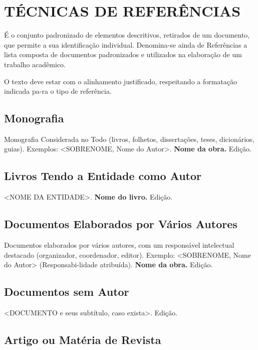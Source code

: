 %
%

\chapter{TÉCNICAS DE REFERÊNCIAS}

É o conjunto padronizado de elementos descritivos, retirados de um documento, que permite a sua identificação individual. Denomina-se ainda de Referências a lista composta de documentos padronizados e utilizados na elaboração de um trabalho acadêmico.

O texto deve estar com o alinhamento justificado, respeitando a formatação indicada pa-ra o tipo de referência. 

\section{Monografia}

Monografia Considerada no Todo (livros, folhetos, dissertações,
teses, dicionários, guias). Exemplos: <SOBRENOME, Nome do Autor>. \textbf{Nome
da obra.} Edição.

\section{Livros Tendo a Entidade como Autor}

<NOME DA ENTIDADE>. \textbf{Nome do livro.} Edição.

\section{Documentos Elaborados por Vários Autores}

Documentos elaborados por vários autores, com um responsável
intelectual destacado (organizador, coordenador, editor). Exemplo: <SOBRENOME,
Nome do Autor> (Responsabi-lidade atribuída). \textbf{Nome da obra.} Edição.

\section{Documentos sem Autor}

<DOCUMENTO e seus subtítulo, caso exista>. Edição. 

\section{Artigo ou Matéria de Revista}

